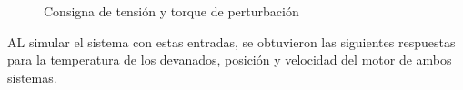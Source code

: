 \documentclass[a4paper, 10pt, onecolumn,journal]{ieeeconf}
\begin{document}
\begin{figure}[H]
	\centering
	\begin{adjustbox}{max width=\columnwidth}
	\end{adjustbox}
	\caption{Consigna de tensión y torque de perturbación}
	\label{Consigna de tensión y torque de perturbación}
\end{figure}
AL simular el sistema con estas entradas, se obtuvieron las siguientes respuestas para la temperatura de los devanados, posición y velocidad del motor de ambos sistemas.
\end{document}
